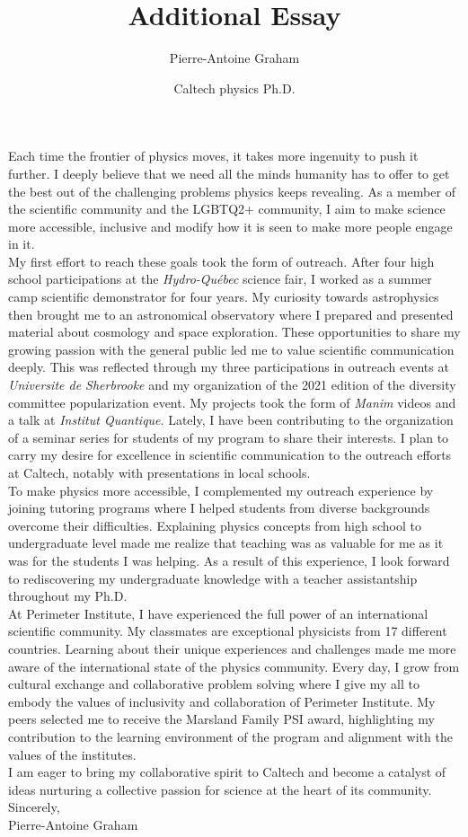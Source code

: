 \documentclass[12pt]{article}
\title{Additional Essay}
\author{Pierre-Antoine Graham}
\date{Caltech physics Ph.D.}
\begin{document}
\maketitle
\vspace{0.5cm}

Each time the frontier of physics moves, it takes more ingenuity to push it further. I deeply believe that we need all the minds humanity has to offer to get the best out of the challenging problems physics keeps revealing. As a member of the scientific community and the LGBTQ2+ community, I aim to make science more accessible, inclusive and modify how it is seen to make more people engage in it.\\[0.3cm]

My first effort to reach these goals took the form of outreach. After four high school participations at the \textit{Hydro-Québec} science fair, I worked as a summer camp scientific demonstrator for four years. My curiosity towards astrophysics then brought me to an astronomical observatory where I prepared and presented material about cosmology and space exploration. These opportunities to share my growing passion with the general public led me to value scientific communication deeply. This was reflected through my three participations in outreach events at \textit{Universite de Sherbrooke} and my organization of the 2021 edition of the diversity committee popularization event. My projects took the form of \textit{Manim} videos and a talk at \textit{Institut Quantique}. Lately, I have been contributing to the organization of a seminar series for students of my program to share their interests. I plan to carry my desire for excellence in scientific communication to the outreach efforts at Caltech, notably with presentations in  local schools.\\[0.3cm]

To make physics more accessible, I complemented my outreach experience by joining tutoring programs where I helped students from diverse backgrounds overcome their difficulties. Explaining physics concepts from high school to undergraduate level made me realize that teaching was as valuable for me as it was for the students I was helping. As a result of this experience, I look forward to rediscovering my undergraduate knowledge with a teacher assistantship throughout my Ph.D.\\[0.3cm]

At Perimeter Institute, I have experienced the full power of an international scientific community. My classmates are exceptional physicists from 17 different countries. Learning about their unique experiences and challenges made me more aware of the international state of the physics community. Every day, I grow from cultural exchange and collaborative problem solving where I give my all to embody the values of inclusivity and collaboration of Perimeter Institute. My peers selected me to receive the Marsland Family PSI award, highlighting my contribution to the learning environment of the program and alignment with the values of the institutes.\\[0.3cm]

I am eager to bring my collaborative spirit to Caltech and become a catalyst of ideas nurturing a collective passion for science at the heart of its community. \\[0.3cm]

Sincerely, \\

Pierre-Antoine Graham
\end{document}
